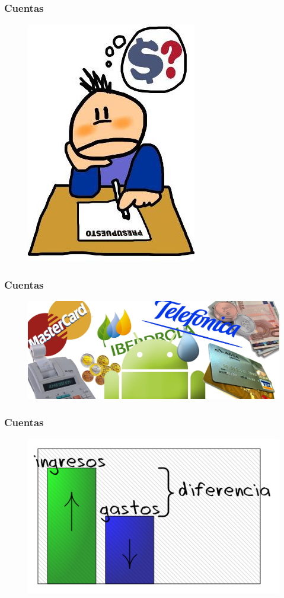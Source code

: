 \documentclass{beamer}
\begin{document}
\begin{frame}[allowframbreaks]
\frametitle{Cuentas}
\begin{figure}[h]
\centering
\includegraphics[height=0.5\textheight]{presupuesto2.jpeg}
\end{figure}
\end{frame}

\begin{frame}[allowframbreaks]
\frametitle{Cuentas}
\begin{figure}[h]
\centering
\includegraphics[height=0.5\textheight]{gastos.jpg}
\end{figure}
\end{frame}

\begin{frame}[allowframbreaks]
\frametitle{Cuentas}
\begin{figure}[h]
\centering
\includegraphics[height=0.5\textheight]{cuenta.png}
\end{figure}
\end{frame}
\end{document}

